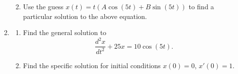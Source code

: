 \begin{enumerate}[resume]
\begin{enumerate}
\clearpage

\item Use the guess $x(t) = t(A\cos(5t) + B\sin(5t))$ to find a particular solution to the above equation. \label{07problem15parte} \vfill

\end{enumerate}

\item \label{07problem16}
\begin{enumerate}
\item Find the general solution to \label{07problem16parta}
\[
\frac{d^2x}{dt^2}+25x=10\cos(5t).
\]
\vspace{1in}
\item Find the specific solution for initial conditions $x(0)=0$, $x'(0)=1$. \label{07problem16partb} \vfill

\end{enumerate}

\end{enumerate}

\clearpage


